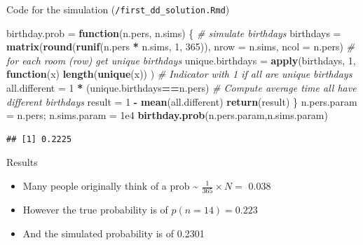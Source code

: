 \documentclass[ignorenonframetext,]{beamer}
\newenvironment{Shaded}{\begin{snugshade}}{\end{snugshade}}
\newcommand{\CommentTok}[1]{\textcolor[rgb]{0.56,0.35,0.01}{\textit{#1}}}
\newcommand{\ControlFlowTok}[1]{\textcolor[rgb]{0.13,0.29,0.53}{\textbf{#1}}}
\newcommand{\DataTypeTok}[1]{\textcolor[rgb]{0.13,0.29,0.53}{#1}}
\newcommand{\DecValTok}[1]{\textcolor[rgb]{0.00,0.00,0.81}{#1}}
\newcommand{\FloatTok}[1]{\textcolor[rgb]{0.00,0.00,0.81}{#1}}
\newcommand{\KeywordTok}[1]{\textcolor[rgb]{0.13,0.29,0.53}{\textbf{#1}}}
\newcommand{\NormalTok}[1]{#1}
\newcommand{\OperatorTok}[1]{\textcolor[rgb]{0.81,0.36,0.00}{\textbf{#1}}}
\newcommand{\StringTok}[1]{\textcolor[rgb]{0.31,0.60,0.02}{#1}}
\providecommand{\tightlist}{%
  \setlength{\itemsep}{0pt}\setlength{\parskip}{0pt}}
\begin{document}
\begin{frame}[fragile]{Code for the simulation
(\texttt{/first\_dd\_solution.Rmd})}
\protect\hypertarget{code-for-the-simulation-first_dd_solution.rmd}{}

\begin{Shaded}
\begin{Highlighting}[]
\NormalTok{birthday.prob =}\StringTok{ }\ControlFlowTok{function}\NormalTok{(n.pers, n.sims) \{}
  \CommentTok{# simulate birthdays}
\NormalTok{  birthdays =}\StringTok{ }\KeywordTok{matrix}\NormalTok{(}\KeywordTok{round}\NormalTok{(}\KeywordTok{runif}\NormalTok{(n.pers }\OperatorTok{*}\StringTok{ }\NormalTok{n.sims, }
                                 \DecValTok{1}\NormalTok{, }\DecValTok{365}\NormalTok{)), }
                      \DataTypeTok{nrow =}\NormalTok{ n.sims, }\DataTypeTok{ncol =}\NormalTok{ n.pers)}
  \CommentTok{# for each room (row) get unique birthdays}
\NormalTok{  unique.birthdays =}\StringTok{ }\KeywordTok{apply}\NormalTok{(birthdays, }\DecValTok{1}\NormalTok{, }
                           \ControlFlowTok{function}\NormalTok{(x) }
                             \KeywordTok{length}\NormalTok{(}\KeywordTok{unique}\NormalTok{(x)) )}
  \CommentTok{# Indicator with 1 if all are unique birthdays}
\NormalTok{  all.different =}\StringTok{ }\DecValTok{1} \OperatorTok{*}\StringTok{ }\NormalTok{(unique.birthdays}\OperatorTok{==}\NormalTok{n.pers)}
  \CommentTok{# Compute average time all have different birthdays }
\NormalTok{  result =}\StringTok{ }\DecValTok{1} \OperatorTok{-}\StringTok{ }\KeywordTok{mean}\NormalTok{(all.different)}
\KeywordTok{return}\NormalTok{(result)}
\NormalTok{\}}
\NormalTok{n.pers.param =}\StringTok{ }\NormalTok{n.pers; n.sims.param =}\StringTok{ }\FloatTok{1e4}
\KeywordTok{birthday.prob}\NormalTok{(n.pers.param,n.sims.param)}
\end{Highlighting}
\end{Shaded}

\begin{verbatim}
## [1] 0.2225
\end{verbatim}

\end{frame}

\begin{frame}{Results}
\protect\hypertarget{results}{}

\begin{itemize}
\tightlist
\item
  Many people originally think of a prob \textasciitilde{}
  \(\frac{1}{365} \times N =\) 0.038
\item
  However the true probability is of \(p(n= 14) = 0.223\)
\item
  And the simulated probability is of 0.2301
\end{itemize}

\end{frame}
\end{document}
